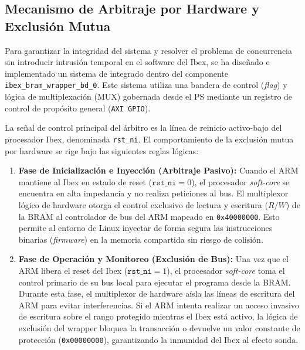 \subsection{Mecanismo de Arbitraje por Hardware y Exclusión Mutua}
\label{ssec:arbitraje_hardware}

Para garantizar la integridad del sistema y resolver el problema de concurrencia sin introducir intrusión temporal en el software del Ibex, se ha diseñado e implementado un sistema de  integrado dentro del componente \texttt{ibex\_bram\_wrapper\_bd\_0}. Este sistema utiliza una bandera de control (\textit{flag}) y lógica de multiplexación (MUX) gobernada desde el PS mediante un registro de control de propósito general (\texttt{AXI GPIO}).

La señal de control principal del árbitro es la línea de reinicio activo-bajo del procesador Ibex, denominada \texttt{rst\_ni}. El comportamiento de la exclusión mutua por hardware se rige bajo las siguientes reglas lógicas:

\begin{enumerate}
    \item \textbf{Fase de Inicialización e Inyección (Arbitraje Pasivo):} 
    Cuando el ARM mantiene al Ibex en estado de reset ($\texttt{rst\_ni} = 0$), el procesador \textit{soft-core} se encuentra en alta impedancia y no realiza peticiones al bus. El multiplexor lógico de hardware otorga el control exclusivo de lectura y escritura ($R/W$) de la BRAM al controlador de bus del ARM mapeado en \texttt{0x40000000}. Esto permite al entorno de Linux inyectar de forma segura las instrucciones binarias (\textit{firmware}) en la memoria compartida sin riesgo de colisión.
    
    \item \textbf{Fase de Operación y Monitoreo (Exclusión de Bus):} 
    Una vez que el ARM libera el reset del Ibex ($\texttt{rst\_ni} = 1$), el procesador \textit{soft-core} toma el control primario de su bus local para ejecutar el programa desde la BRAM. Durante esta fase, el multiplexor de hardware aísla las líneas de escritura del ARM para evitar interferencias. Si el ARM intenta realizar un acceso invasivo de escritura sobre el rango protegido mientras el Ibex está activo, la lógica de exclusión del wrapper bloquea la transacción o devuelve un valor constante de protección (\texttt{0x00000000}), garantizando la inmunidad del Ibex al efecto sonda.
\end{enumerate}

